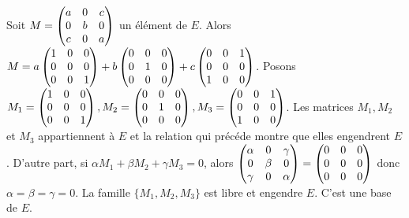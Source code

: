 {{Soit  $M= \begin{pmatrix} a & 0 & c \cr 0 & b & 0 \cr c & 0 & a
\cr \end{pmatrix} $  un \' el\' ement de  $E$.  Alors  $M=
 a\begin{pmatrix} 1 & 0 & 0 \cr
0 & 0 & 0 \cr 0 & 0 & 1 \cr \end{pmatrix} + b
\begin{pmatrix} 0 & 0 & 0 \cr
0 & 1 & 0 \cr 0 & 0 & 0 \cr \end{pmatrix}+c
 \begin{pmatrix} 0 & 0 & 1 \cr
0 & 0 & 0 \cr 1 & 0 & 0 \cr \end{pmatrix}
 $. Posons  $M_1=
 \begin{pmatrix} 1 & 0 & 0 \cr
0 & 0 & 0 \cr 0 & 0 & 1 \cr \end{pmatrix} ,  M_2=
\begin{pmatrix} 0 & 0 & 0 \cr
0 & 1 & 0 \cr 0 & 0 & 0 \cr \end{pmatrix} ,  M_3=
 \begin{pmatrix} 0 & 0 & 1 \cr
0 & 0 & 0 \cr 1 & 0 & 0 \cr \end{pmatrix}
 $.  Les matrices  $M_1 ,  M_2$  et  $M_3$  appartiennent \`a  $E$  et la relation qui pr\' ec\' ede
montre que  elles engendrent  $E$. D'autre part, si  $\alpha M_1 +
\beta M_2 + \gamma M_3 =0$, alors  $\begin{pmatrix} \alpha & 0 &
\gamma \cr 0 & \beta  & 0 \cr \gamma & 0 & \alpha \cr
\end{pmatrix} =\begin{pmatrix} 0 & 0 & 0 \cr 0 & 0 & 0 \cr 0 & 0 &
0 \cr \end{pmatrix} $  donc  $\alpha = \beta =\gamma =0$. La
famille  $\{ M_1 ,  M_2 , M_3 \}$  est libre et engendre  $E$.
C'est une base de  $E$.
}
}
